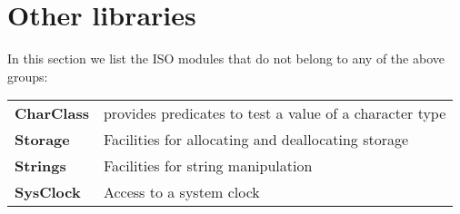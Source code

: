 \section{Other libraries}

In this section we list the ISO modules that do not belong
to any of the above groups:
\begin{flushleft}
\begin{tabular}{ll}
\bf CharClass &  provides predicates to test a value
                 of a character type                             \\
\bf Storage &    Facilities for allocating
                 and deallocating storage                          \\
\bf Strings &    Facilities for string manipulation               \\
\bf SysClock &   Access to a system clock
\end{tabular}
\end{flushleft}


